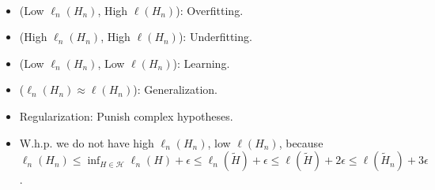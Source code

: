 \documentclass[8pt,a4paper]{extarticle}
\newenvironment{topic}[1]
{\textbf{\sffamily \colorbox{black}{\rlap{\textbf{\textcolor{white}{#1}}}\hspace{\linewidth}\hspace{-2\fboxsep}}} \\ \vspace{0.2cm}}
{}
\begin{document}
\begin{multicols*}{2}
\begin{topic}{Risk minimization}
\begin{itemize}
\begin{itemize}
                      \item (Low $\ell_n(H_n)$, High $\ell(H_n)$): Overfitting.
                      \item (High $\ell_n(H_n)$, High $\ell(H_n)$): Underfitting.
                      \item (Low $\ell_n(H_n)$, Low $\ell(H_n)$): Learning.
                      \item ($\ell_n(H_n) \approx \ell(H_n)$): Generalization.
                      \item Regularization: Punish complex hypotheses.
                      \item W.h.p. we do not have high $\ell_n(H_n)$, low $\ell(H_n)$, because $\ell_n(H_n) \leq \inf_{H \in
                                    \mathcal{H}} \ell_n(H) + \epsilon \leq \ell_n(\tilde{H}) + \epsilon \leq \ell(\tilde{H}) + 2
                                \epsilon \leq \ell(\tilde{H}_n) + 3 \epsilon$.
                  \end{itemize}
        \end{itemize}
    \end{topic}


\end{multicols*}
\end{document}
